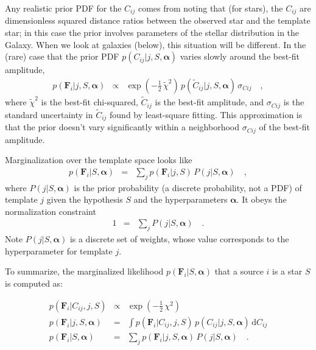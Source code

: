 \documentclass[12pt,preprint]{aastex}
\newcommand{\datavector}[1]{\boldsymbol{#1}}
\newcommand{\flux}{\datavector{F}}
\newcommand{\hyperpars}{\datavector{\alpha}}
\newcommand{\dd}{\mathrm{d}}
\begin{document}
Any realistic prior PDF for the $C_{ij}$ comes from noting that (for
stars), the $C_{ij}$ are dimensionless squared distance ratios between
the observed star and the template star; in this case the prior
involves parameters of the stellar distribution in the Galaxy.  When
we look at galaxies (below), this situation will be different.  In the
(rare) case that the prior PDF $p(C_{ij}|j,S,\hyperpars)$ varies
slowly around the best-fit amplitude,
\begin{eqnarray}\displaystyle
p(\flux_i|j,S,\hyperpars) & \propto & \exp(-\frac{1}{2}\,\tilde{\chi}^2)
  \,p(\tilde{C}_{ij}|j,S,\hyperpars)\,\sigma_{Cij}
\quad ,
\end{eqnarray}
where $\tilde{\chi}^2$ is the best-fit chi-squared, $\tilde{C}_{ij}$
is the best-fit amplitude, and $\sigma_{Cij}$ is the standard
uncertainty in $\tilde{C}_{ij}$ found by least-square fitting.  This
approximation is that the prior doesn't vary significantly
within a neighborhood $\sigma_{Cij}$ of the best-fit amplitude.  

Marginalization over the template space looks like
\begin{eqnarray}\displaystyle
p(\flux_i|S,\hyperpars) & = & \sum_j p(\flux_i|j,S)\,P(j|S,\hyperpars)
\quad ,
\label{eqn:tempmarg}
\end{eqnarray}
where $P(j|S,\hyperpars)$ is the prior probability (a discrete
probability, not a PDF) of template $j$ given the hypothesis $S$ and
the hyperparameters $\hyperpars$.  It obeys the normalization
constraint
\begin{eqnarray}\displaystyle
1 & = & \sum_j P(j|S,\hyperpars)
\quad .
\label{eqn:tempconstraint}
\end{eqnarray}
\noindent Note $P(j|S,\hyperpars)$ is a discrete set of weights, 
whose value corresponds to the hyperparameter for template $j$.

To summarize, the marginalized likelihood $p(\flux_i|S,\hyperpars)$ that 
a source $i$ is a star $S$ is computed as:

\begin{eqnarray}\displaystyle
\label{eqn:starmarg} 
p(\flux_i|C_{ij},j,S) & \propto & \exp(-\frac{1}{2}\,\chi^2)
\nonumber\\
p(\flux_i|j,S,\hyperpars) & = & \int p(\flux_i|C_{ij},j,S)\,p(C_{ij}|j,S,\hyperpars)\,\dd C_{ij}
\nonumber\\
p(\flux_i|S,\hyperpars) & = & \sum_j p(\flux_i|j,S,\hyperpars)\,P(j|S,\hyperpars)
\quad .
\end{eqnarray}
\end{document}
